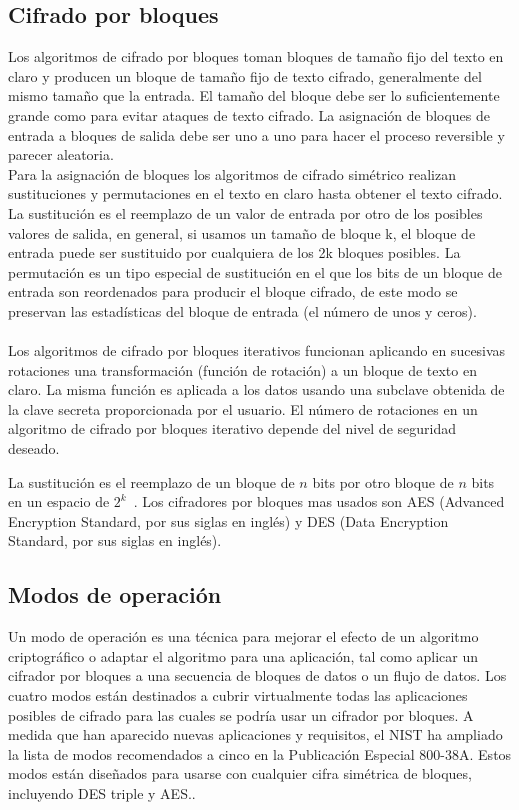 \subsection{Cifrado por bloques}
Los algoritmos de cifrado por bloques toman bloques de tamaño fijo del texto en claro y producen un bloque de tamaño fijo de texto cifrado, generalmente del mismo tamaño que la entrada. El tamaño del bloque debe ser lo suficientemente grande como para evitar ataques de texto cifrado. La asignación de bloques de entrada a bloques de salida debe ser uno a uno para hacer el proceso reversible y parecer aleatoria.\\ 
Para la asignación de bloques los algoritmos de cifrado simétrico realizan sustituciones y permutaciones en el texto en claro hasta obtener el texto cifrado.\\ 
La sustitución es el reemplazo de un valor de entrada por otro de los posibles valores de salida, en general, si usamos un tamaño de bloque k, el bloque de entrada puede ser sustituido por cualquiera de los 2k bloques posibles.
La permutación es un tipo especial de sustitución en el que los bits de un bloque de entrada son reordenados para producir el bloque cifrado, de este modo se preservan las estadísticas del bloque de entrada (el número de unos y ceros). \\ \\  Los algoritmos de cifrado por bloques iterativos funcionan aplicando en sucesivas rotaciones una transformación
(función de rotación) a un bloque de texto en claro. La misma función es aplicada a los datos usando una subclave
obtenida de la clave secreta proporcionada por el usuario. El número de rotaciones en un algoritmo de cifrado por
bloques iterativo depende del nivel de seguridad deseado.


La sustitución es el reemplazo de un bloque de $n$ bits por otro bloque de $n$ bits en un espacio de 
$2^{k}$~\cite{bloc}. Los cifradores por bloques mas usados son AES (Advanced Encryption Standard, por sus 
siglas en ingl\'es) y DES (Data Encryption Standard, por sus siglas en ingl\'es).

\pagebreak

\subsection{Modos de operación}
Un modo de operación es una técnica para mejorar el efecto de un algoritmo criptográfico o adaptar el algoritmo para una aplicación, tal como aplicar un cifrador por bloques a una secuencia de bloques de datos o un flujo de datos. Los cuatro modos están destinados a cubrir virtualmente todas las aplicaciones posibles de cifrado para las cuales se podría usar un cifrador por bloques. A medida que han aparecido nuevas aplicaciones y requisitos, el NIST ha ampliado la lista de modos recomendados a cinco en la Publicación Especial 800-38A. Estos modos están diseñados para usarse con cualquier cifra simétrica de bloques, incluyendo DES triple y AES..\\\\


